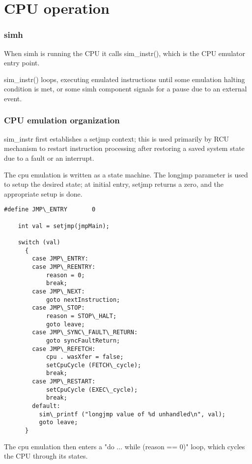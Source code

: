 \documentclass[notitlepage]{report}
\begin{document}
\part{CPU operation}

\section{simh}

When simh is running the CPU it calls sim\_instr(), which is the CPU emulator entry point.

sim\_instr() loops, executing emulated instructions until some emulation halting condition is met, or some simh component signals for a pause due to an external
event.

\section{CPU emulation organization}

sim\_instr first establishes a setjmp context; this is used primarily by RCU 
mechanism to restart instruction processing after restoring a saved system
state due to a fault or an interrupt.

The cpu emulation is written as a state machine. The longjmp parameter is 
used to setup the desired state; at initial entry, setjmp returns a zero, 
and the appropriate setup is done.

\begin{verbatim}
#define JMP\_ENTRY       0

    int val = setjmp(jmpMain);

    switch (val)
      {
        case JMP\_ENTRY:
        case JMP\_REENTRY:
            reason = 0;
            break;
        case JMP\_NEXT:
            goto nextInstruction;
        case JMP\_STOP:
            reason = STOP\_HALT;
            goto leave;
        case JMP\_SYNC\_FAULT\_RETURN:
            goto syncFaultReturn;
        case JMP\_REFETCH:
            cpu . wasXfer = false;
            setCpuCycle (FETCH\_cycle);
            break;
        case JMP\_RESTART:
            setCpuCycle (EXEC\_cycle);
            break;
        default:
          sim\_printf ("longjmp value of %d unhandled\n", val);
          goto leave;
      }

\end{verbatim}

The cpu emulation then enters a "do {...} while (reason == 0)" loop,
which cycles the CPU through its states.
\end{document}
